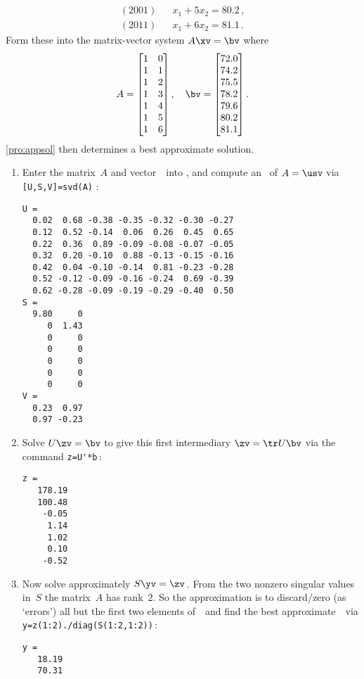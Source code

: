 \begin{example}
\begin{solution}
\begin{eqnarray*}
\\(2001)&&x_1+5x_2=80.2\,,
\\(2011)&&x_1+6x_2=81.1\,.
\end{eqnarray*}
Form these into the matrix-vector system \(A\xv=\bv\) where
\begin{equation*}
A= \begin{bmatrix} 1&0\\1&1\\1&2\\1&3\\1&4\\1&5\\1&6 \end{bmatrix},
\quad \bv=\begin{bmatrix}72.0\\74.2\\75.5\\78.2\\79.6\\80.2\\81.1\end{bmatrix}.
\end{equation*}
\cref{pro:appsol} then determines a best approximate solution.
\begin{enumerate}
\item Enter the matrix~\(A\) and vector~\bv\ into \script, and compute an \svd\ of \(A=\usv\) via \verb|[U,S,V]=svd(A)| \twodp:
\setbox\ajrqrbox\hbox{}%
\marginajrbox%
\begin{verbatim}
U =
  0.02  0.68 -0.38 -0.35 -0.32 -0.30 -0.27
  0.12  0.52 -0.14  0.06  0.26  0.45  0.65
  0.22  0.36  0.89 -0.09 -0.08 -0.07 -0.05
  0.32  0.20 -0.10  0.88 -0.13 -0.15 -0.16
  0.42  0.04 -0.10 -0.14  0.81 -0.23 -0.28
  0.52 -0.12 -0.09 -0.16 -0.24  0.69 -0.39
  0.62 -0.28 -0.09 -0.19 -0.29 -0.40  0.50
S =
  9.80     0
     0  1.43
     0     0
     0     0
     0     0
     0     0
     0     0
V =
  0.23  0.97
  0.97 -0.23
\end{verbatim}
\item Solve \(U\zv=\bv\) to give this first intermediary \(\zv=\tr U\bv\) via the command \verb|z=U'*b|\,:
\begin{verbatim}
z =
   178.19
   100.48
    -0.05
     1.14
     1.02
     0.10
    -0.52
\end{verbatim}

\item Now solve approximately \(S\yv=\zv\)\,. 
From the two nonzero singular values in~\(S\) the matrix~\(A\) has rank~\(2\).
So the approximation is to discard\slash zero (as `errors') all but the first two elements of~\zv\ and find the best approximate~\yv\ via \verb|y=z(1:2)./diag(S(1:2,1:2))|\,:
\begin{verbatim}
y =
   18.19
   70.31
\end{verbatim}


\end{enumerate}
\end{solution}
\end{example}
